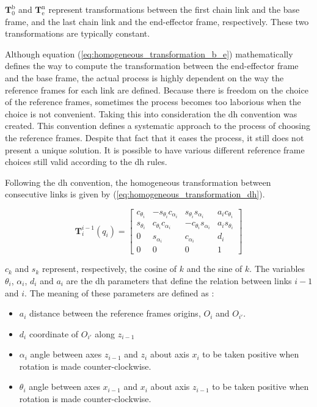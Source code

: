 $\boldsymbol{T}^{\text{b}}_{\text{0}}$ and $\boldsymbol{T}^{\text{n}}_{\text{e}}$ represent transformations between the first chain link and the base frame, and the last chain link and the end-effector frame, respectively. These two transformations are typically constant.

Although equation (\ref{eq:homogeneous_transformation_b_e}) mathematically defines the way to compute the transformation between the end-effector frame and the base frame, the actual process is highly dependent on the way the reference frames for each link are defined. Because there is freedom on the choice of the reference frames, sometimes the process becomes too laborious when the choice is not convenient. Taking this into consideration the \gls{dh} convention was created. This convention defines a systematic approach to the process of choosing the reference frames. Despite that fact that it eases the process, it still does not present a unique solution. It is possible to have various different reference frame choices still valid according to the \gls{dh} rules.

Following the \gls{dh} convention, the homogeneous transformation between consecutive links is given by (\ref{eq:homogeneous_transformation_dh}).

\begin{equation}
    \label{eq:homogeneous_transformation_dh}
    \boldsymbol{T}^{i-1}_{i}(q_i) = \begin{bmatrix}
        c_{\theta_i} & -s_{\theta_i}c_{\alpha_i} & s_{\theta_i}s_{\alpha_i} & a_{i}c_{\theta_i}\\
        s_{\theta_i} & c_{\theta_i}c_{\alpha_i} & -c_{\theta_i}s_{\alpha_i} & a_{i}s_{\theta_i}\\
        0 & s_{\alpha_i} & c_{\alpha_i} & d_{i}\\
        0 & 0 & 0 & 1
    \end{bmatrix}
\end{equation}

$c_k$ and $s_k$ represent, respectively, the cosine of $k$ and the sine of $k$. The variables $\theta_i$, $\alpha_i$, $d_i$ and $a_i$ are the \gls{dh} parameters that define the relation between links $i-1$ and $i$. The meaning of these parameters are defined as \cite{Siciliano2009_robotics_modelling_planning_control}:

\begin{itemize}
    \item $a_i$ distance between the reference frames origins, $O_i$ and $O_{i'}$.
    \item $d_i$ coordinate of $O_{i'}$ along $z_{i-1}$
    \item $\alpha_i$ angle between axes $z_{i-1}$ and $z_i$ about axis $x_i$ to be taken positive when rotation is made counter-clockwise.
    \item $\theta_i$ angle between axes $x_{i-1}$ and $x_i$ about axis $z_{i-1}$ to be taken positive when rotation is made counter-clockwise.
\end{itemize}

